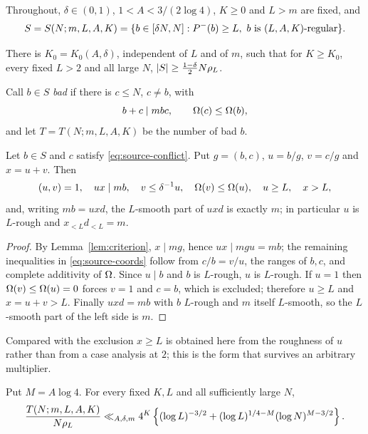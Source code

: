 \documentclass[11pt]{article}
\begin{document}
Throughout, \(\delta\in(0,1)\), \(1<A<3/(2\log4)\), \(K\geq0\) and
\(L>m\) are fixed, and
\[
 S=S(N;m,L,A,K)=\{b\in[\delta N,N]:P^-(b)\geq L,\
 b\text{ is }(L,A,K)\text{-regular}\}.
\]

\begin{lemma}\label{lem:source-density}
There is \(K_0=K_0(A,\delta)\), independent of \(L\) and of \(m\), such that
for \(K\geq K_0\), every fixed \(L>2\) and all large \(N\),
\(\left|S\right|\geq\frac{1-\delta}{2}N\rho_L\).
\end{lemma}

Call \(b\in S\) \emph{bad} if there is \(c\leq N\), \(c\ne b\), with
\begin{equation}\label{eq:source-conflict}
 b+c\mid mbc,\qquad \Omega(c)\leq\Omega(b),
\end{equation}
and let \(T=T(N;m,L,A,K)\) be the number of bad \(b\).

\begin{lemma}\label{lem:source-coords}
Let \(b\in S\) and \(c\) satisfy \eqref{eq:source-conflict}. Put
\(g=(b,c)\), \(u=b/g\), \(v=c/g\) and \(x=u+v\). Then
\begin{equation}\label{eq:source-coords}
 (u,v)=1,\quad ux\mid mb,\quad v\leq\delta^{-1}u,\quad
 \Omega(v)\leq\Omega(u),\quad u\geq L,\quad x>L,
\end{equation}
and, writing \(mb=uxd\), the \(L\)-smooth part of \(uxd\) is exactly \(m\);
in particular \(u\) is \(L\)-rough and \(x_{<L}d_{<L}=m\).
\end{lemma}

\begin{proof}
By Lemma~\ref{lem:criterion}, \(x\mid mg\), hence \(ux\mid mgu=mb\); the
remaining inequalities in \eqref{eq:source-coords} follow from \(c/b=v/u\),
the ranges of \(b,c\), and complete additivity of \(\Omega\). Since \(u\mid b\)
and \(b\) is \(L\)-rough, \(u\) is \(L\)-rough. If \(u=1\) then
\(\Omega(v)\leq\Omega(u)=0\) forces \(v=1\) and \(c=b\), which is excluded;
therefore \(u\geq L\) and \(x=u+v>L\). Finally \(uxd=mb\) with \(b\)
\(L\)-rough and \(m\) itself \(L\)-smooth, so the \(L\)-smooth part of the
left side is \(m\).
\end{proof}

Compared with \cite[(4.3)]{DellaPietra2026} the exclusion \(x\geq L\) is
obtained here from the roughness of \(u\) rather than from a case analysis at
\(2\); this is the form that survives an arbitrary multiplier.

\begin{proposition}\label{prop:source-estimate}
Put \(M=A\log4\). For every fixed \(K,L\) and all sufficiently large \(N\),
\begin{equation}\label{eq:source-raw}
 \frac{T(N;m,L,A,K)}{N\rho_L}
 \ll_{A,\delta,m}
 4^K\left\{(\log L)^{-3/2}+(\log L)^{1/4-M}(\log N)^{M-3/2}\right\}.
\end{equation}
\end{proposition}
\end{document}
